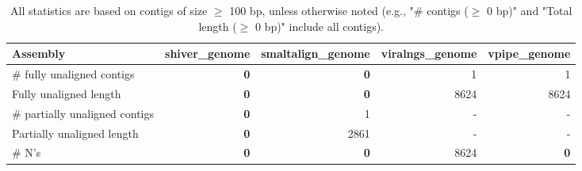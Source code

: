 \documentclass[12pt,a4paper]{article}
\begin{document}
\begin{table}[ht]
\begin{center}
\caption{All statistics are based on contigs of size $\geq$ 100 bp, unless otherwise noted (e.g., "\# contigs ($\geq$ 0 bp)" and "Total length ($\geq$ 0 bp)" include all contigs).}
\begin{tabular}{|l*{4}{|r}|}
\hline
Assembly & shiver\_genome & smaltalign\_genome & viralngs\_genome & vpipe\_genome \\ \hline
\# fully unaligned contigs & {\bf 0} & {\bf 0} & 1 & 1 \\ \hline
Fully unaligned length & {\bf 0} & {\bf 0} & 8624 & 8624 \\ \hline
\# partially unaligned contigs & {\bf 0} & 1 & - & - \\ \hline
Partially unaligned length & {\bf 0} & 2861 & - & - \\ \hline
\# N's & {\bf 0} & {\bf 0} & 8624 & {\bf 0} \\ \hline
\end{tabular}
\end{center}
\end{table}
\end{document}

